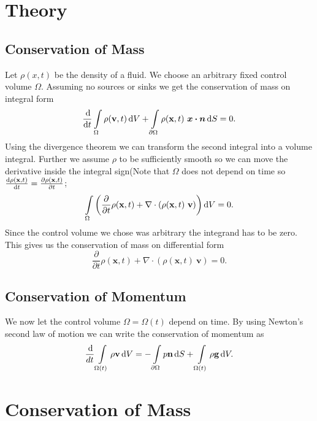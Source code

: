 \documentclass[12pt]{article}
\begin{document}
\section{Theory}
\subsection{Conservation of Mass}
Let $\rho(x,t)$ be the density of a fluid. We choose an arbitrary fixed
control volume
$\Omega$. Assuming no sources or sinks we get the conservation of mass on integral form
\begin{equation}
  \frac{\operatorname{d}\! }{\operatorname{d}\! t}\int\limits_{\Omega}\rho (\mathbf v, t) \operatorname{d}\!
  V + \int\limits_{\partial\Omega} \rho(\mathbf x,
  t)\ \bm{x\cdot n} \operatorname{d}\! S = 0.
\end{equation}
Using the divergence theorem we can transform the second integral into
a volume integral. Further we assume $\rho$ to be sufficiently smooth
so we can move the derivative inside the integral sign(Note that
$\Omega$ does not depend on time so $\frac{\operatorname{d}\! \rho(\mathbf x,t)}{\operatorname{d}\!
  t}= \frac{\partial \rho(\mathbf x, t)}{\partial t}$;
\begin{equation*}
  \int\limits_{\Omega}\left(\frac{\partial }{\partial t}\rho (\mathbf x, t) +
    \nabla\cdot(\rho(\mathbf x, t)\ \mathbf v) \right)\operatorname{d}\! V = 0.
\end{equation*}
Since the control volume we chose was arbitrary the integrand has to
be zero. This gives us the conservation of mass on differential form
\begin{equation}
  \frac{\partial }{\partial t}\rho (\mathbf x, t) +
    \nabla\cdot(\rho(\mathbf x, t)\ \mathbf v)  = 0.
\end{equation}
\subsection{Conservation of Momentum}
We now let the control volume $\Omega=\Omega(t)$ depend on time. 
By using Newton's second law of motion we can write the conservation
of momentum as
\begin{equation}
  \frac{\operatorname{d}\! }{d t}\int\limits_{\Omega(t)}\rho \mathbf v \operatorname{d}\! V =
  -\int\limits_{\partial \Omega}p\mathbf n \operatorname{d}\! S +
  \int\limits_{\Omega(t)}\rho\mathbf g\operatorname{d}\! V.
\end{equation}

\section{Conservation of Mass}
\end{document}
